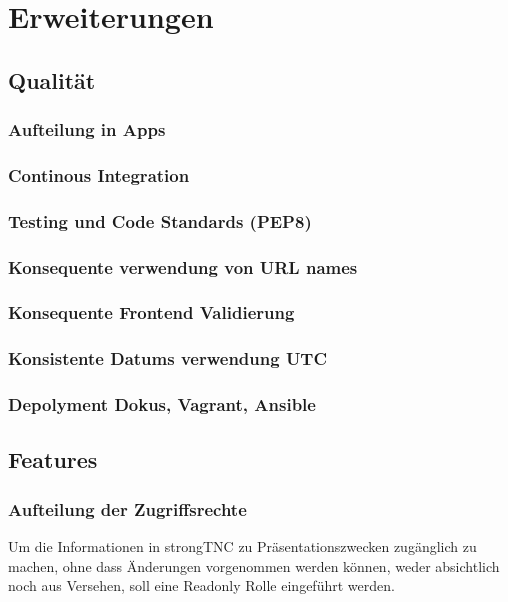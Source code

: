 \section{Erweiterungen}

\subsection{Qualität}

\subsubsection{Aufteilung in Apps}

\subsubsection{Continous Integration}

\subsubsection{Testing und Code Standards (PEP8)}

\subsubsection{Konsequente verwendung von URL names}

\subsubsection{Konsequente Frontend Validierung}


\subsubsection{Konsistente Datums verwendung UTC}

\subsubsection{Depolyment Dokus, Vagrant, Ansible}

\subsection{Features}

\subsubsection{Aufteilung der Zugriffsrechte}
Um die Informationen in strongTNC zu Präsentationszwecken zugänglich zu machen,
ohne dass Änderungen vorgenommen werden können, weder absichtlich noch aus
Versehen, soll eine Readonly Rolle eingeführt werden.

